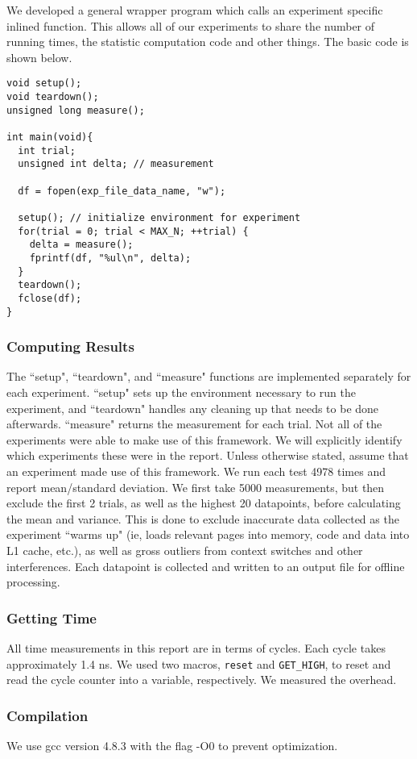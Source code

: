 We developed a general wrapper program which calls an experiment specific inlined function.
This allows all of our experiments to share the number of running times, the statistic computation code and other things.
The basic code is shown below.

\begin{verbatim}
void setup();
void teardown();
unsigned long measure();

int main(void){
  int trial;
  unsigned int delta; // measurement

  df = fopen(exp_file_data_name, "w");

  setup(); // initialize environment for experiment
  for(trial = 0; trial < MAX_N; ++trial) {
    delta = measure();
    fprintf(df, "%ul\n", delta);
  }
  teardown();
  fclose(df);
}
\end{verbatim}

\subsubsection{Computing Results}

The ``setup", ``teardown", and ``measure" functions are implemented separately for each experiment. ``setup" sets up the environment necessary to run the experiment, and ``teardown" handles any cleaning up that needs to be done afterwards. ``measure" returns the measurement for each trial.
\newline
\newline
Not all of the experiments were able to make use of this framework. We will explicitly identify which experiments these were in the report. Unless otherwise stated, assume that an experiment made use of this framework.
\newline
\newline
We run each test 4978 times and report mean/standard deviation. We first take 5000 measurements, but then exclude the first 2 trials, as well as the highest 20 datapoints, before calculating the mean and variance. This is done to exclude inaccurate data collected as the experiment ``warms up" (ie, loads relevant pages into memory, code and data into L1 cache, etc.), as well as gross outliers from context switches and other interferences.
\newline
\newline
Each datapoint is collected and written to an output file for offline processing.

\subsubsection{Getting Time}
All time measurements in this report are in terms of cycles. Each cycle takes approximately 1.4 ns. We used two macros, {\tt reset} and {\tt GET\_HIGH}, to reset and read the cycle counter into a variable, respectively. We measured the overhead.

\subsubsection{Compilation}
We use gcc version 4.8.3 with the flag -O0 to prevent optimization.